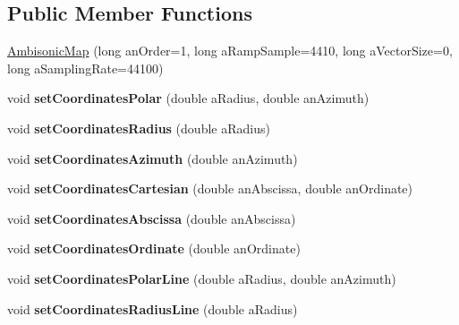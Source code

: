 \subsection*{Public Member Functions}
\begin{DoxyCompactItemize}
\item 
\hyperlink{class_ambisonic_map_a44db87a2d97aa5851b5fc81be2a33d08}{Ambisonic\-Map} (long an\-Order=1, long a\-Ramp\-Sample=4410, long a\-Vector\-Size=0, long a\-Sampling\-Rate=44100)
\item 
\hypertarget{class_ambisonic_map_a173c1954e24da00046a1868dc8201ba3}{void {\bfseries set\-Coordinates\-Polar} (double a\-Radius, double an\-Azimuth)}\label{class_ambisonic_map_a173c1954e24da00046a1868dc8201ba3}

\item 
\hypertarget{class_ambisonic_map_a7fe9ea5934a91cf6bdcac07ebb680e53}{void {\bfseries set\-Coordinates\-Radius} (double a\-Radius)}\label{class_ambisonic_map_a7fe9ea5934a91cf6bdcac07ebb680e53}

\item 
\hypertarget{class_ambisonic_map_a3eefae0187c16bd9cdf61cb6a4c10eba}{void {\bfseries set\-Coordinates\-Azimuth} (double an\-Azimuth)}\label{class_ambisonic_map_a3eefae0187c16bd9cdf61cb6a4c10eba}

\item 
\hypertarget{class_ambisonic_map_aa642c6d73f5fdb663313b07c33f39c2d}{void {\bfseries set\-Coordinates\-Cartesian} (double an\-Abscissa, double an\-Ordinate)}\label{class_ambisonic_map_aa642c6d73f5fdb663313b07c33f39c2d}

\item 
\hypertarget{class_ambisonic_map_a222f4b3ff1ec2cfadf4cc05bed587ae8}{void {\bfseries set\-Coordinates\-Abscissa} (double an\-Abscissa)}\label{class_ambisonic_map_a222f4b3ff1ec2cfadf4cc05bed587ae8}

\item 
\hypertarget{class_ambisonic_map_afa06748f24d27bda2e362ddf8939af41}{void {\bfseries set\-Coordinates\-Ordinate} (double an\-Ordinate)}\label{class_ambisonic_map_afa06748f24d27bda2e362ddf8939af41}

\item 
\hypertarget{class_ambisonic_map_a9c8dc8784e41832294317ed64066b4d4}{void {\bfseries set\-Coordinates\-Polar\-Line} (double a\-Radius, double an\-Azimuth)}\label{class_ambisonic_map_a9c8dc8784e41832294317ed64066b4d4}

\item 
\hypertarget{class_ambisonic_map_a35053d19e06f0a49f949dae2b70b3e2b}{void {\bfseries set\-Coordinates\-Radius\-Line} (double a\-Radius)}\label{class_ambisonic_map_a35053d19e06f0a49f949dae2b70b3e2b}


\end{DoxyCompactItemize}
